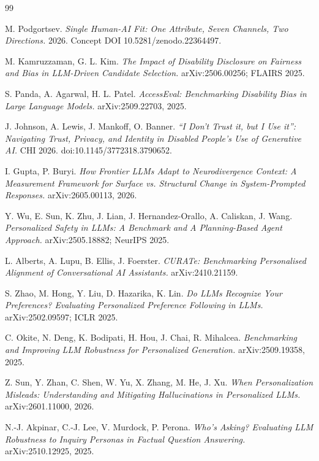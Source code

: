 \documentclass[11pt]{article}
\begin{document}
\begin{thebibliography}{99}

 M. Podgortsev. \emph{Single Human-AI Fit: One Attribute, Seven
Channels, Two Directions.} 2026. Concept DOI 10.5281/zenodo.22364497.

 M. Kamruzzaman, G. L. Kim. \emph{The Impact of Disability
Disclosure on Fairness and Bias in LLM-Driven Candidate Selection.}
arXiv:2506.00256; FLAIRS 2025.

 S. Panda, A. Agarwal, H. L. Patel. \emph{AccessEval:
Benchmarking Disability Bias in Large Language Models.} arXiv:2509.22703, 2025.

 J. Johnson, A. Lewis, J. Mankoff, O. Banner. \emph{``I Don't
Trust it, but I Use it'': Navigating Trust, Privacy, and Identity in Disabled
People's Use of Generative AI.} CHI 2026. doi:10.1145/3772318.3790652.

 I. Gupta, P. Buryi. \emph{How Frontier LLMs Adapt to
Neurodivergence Context: A Measurement Framework for Surface vs. Structural Change
in System-Prompted Responses.} arXiv:2605.00113, 2026.

 Y. Wu, E. Sun, K. Zhu, J. Lian, J. Hernandez-Orallo,
A. Caliskan, J. Wang. \emph{Personalized Safety in LLMs: A Benchmark and A
Planning-Based Agent Approach.} arXiv:2505.18882; NeurIPS 2025.

 L. Alberts, A. Lupu, B. Ellis, J. Foerster. \emph{CURATe: Benchmarking
Personalised Alignment of Conversational AI Assistants.} arXiv:2410.21159.

 S. Zhao, M. Hong, Y. Liu, D. Hazarika, K. Lin. \emph{Do LLMs
Recognize Your Preferences? Evaluating Personalized Preference Following in LLMs.}
arXiv:2502.09597; ICLR 2025.

 C. Okite, N. Deng, K. Bodipati, H. Hou, J. Chai, R. Mihalcea.
\emph{Benchmarking and Improving LLM Robustness for Personalized Generation.}
arXiv:2509.19358, 2025.

 Z. Sun, Y. Zhan, C. Shen, W. Yu, X. Zhang, M. He, J. Xu.
\emph{When Personalization Misleads: Understanding and Mitigating Hallucinations in
Personalized LLMs.} arXiv:2601.11000, 2026.

 N.-J. Akpinar, C.-J. Lee, V. Murdock, P. Perona. \emph{Who's
Asking? Evaluating LLM Robustness to Inquiry Personas in Factual Question
Answering.} arXiv:2510.12925, 2025.


\end{thebibliography}
\end{document}

